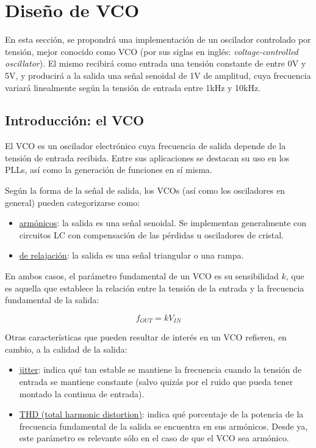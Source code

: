 \documentclass[../../tc_tp6_main.tex]{subfiles}
\begin{document}
\chapter{Dise\~no de VCO}

En esta secci\'on, se propondr\'a una implementaci\'on de un oscilador controlado por tensi\'on, mejor conocido como VCO (por sus siglas en ingl\'es: \textit{voltage-controlled oscillator}). El mismo recibir\'a como entrada una tensi\'on constante de entre 0V y 5V, y producir\'a a la salida una se\~nal senoidal de 1V de amplitud, cuya frecuencia variar\'a linealmente seg\'un la tensi\'on de entrada entre 1kHz y 10kHz. 


\section{Introducci\'on: el VCO}

El VCO es un oscilador electr\'onico cuya frecuencia de salida depende de la tensi\'on de entrada recibida. Entre sus aplicaciones se destacan su uso en los PLLs, as\'i como la generaci\'on de funciones en s\'i misma.\par

Seg\'un la forma de la se\~nal de salida, los VCOs (as\'i como los osciladores en general) pueden categorizarse como:

\begin{itemize}
	\item \underline{arm\'onicos}: la salida es una se\~nal senoidal. Se implementan generalmente con circuitos LC con compensaci\'on de las p\'erdidas  u osciladores de cristal.
	\item \underline{de relajaci\'on}: la salida es una se\~nal triangular o una rampa.
\end{itemize}

En ambos casos, el par\'ametro fundamental de un VCO es su sensibilidad $k$, que es aquella que establece la relaci\'on entre la tensi\'on de la entrada y la frecuencia fundamental de la salida:

\begin{equation}
	f_{OUT} = k V_{IN}
\end{equation}

Otras caracter\'isticas que pueden resultar de inter\'es en un VCO refieren, en cambio, a la calidad de la salida:

\begin{itemize}
	\item \underline{jitter}: indica qu\'e tan estable se mantiene la frecuencia cuando la tensi\'on de entrada se mantiene constante (salvo quiz\'as por el ruido que pueda tener montado la continua de entrada).
	\item \underline{THD (total harmonic distortion)}: indica qu\'e porcentaje de la potencia de la frecuencia fundamental de la salida se encuentra en sus arm\'onicos. Desde ya, este par\'ametro es relevante s\'olo en el caso de que el VCO sea arm\'onico.
\end{itemize}
\end{document}
